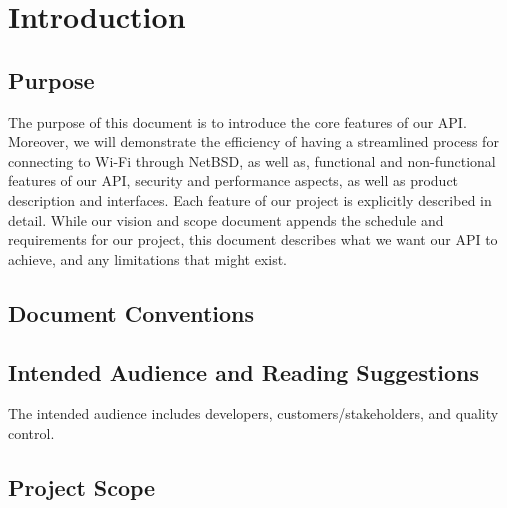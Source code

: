 \section{Introduction}

\subsection{Purpose}

The purpose of this document is to introduce the core features of our API. Moreover, we will demonstrate the efficiency 
of having a streamlined process for connecting to Wi-Fi through NetBSD, as well as, functional and non-functional features 
of our API, security and performance aspects, as well as product description and interfaces. Each feature of our project is 
explicitly described in detail. While our vision and scope document appends the schedule and requirements for our project, this 
document describes what we want our API to achieve, and any limitations that might exist. 

\subsection{Document Conventions}

\subsection{Intended Audience and Reading Suggestions}

The intended audience includes developers, customers/stakeholders, and quality control.

\subsection{Project Scope}

